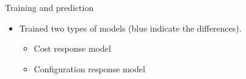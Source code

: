 \documentclass[10pt]{beamer}
\begin{document}
\begin{frame}[t, noframenumbering]{Training and prediction}

\begin{itemize}
\item Trained two types of models (blue indicate the differences).
\begin{itemize}
  \item Cost response model
  \item Configuration response model
\end{itemize}
\end{itemize}


\begin{columns}[T] %
\begin{column}{.5\textwidth}
\end{column}%
\hfill%
{\begin{column}{.5\textwidth}
\begin{figure}[!ht]
\centering

\end{figure}
\end{column}}
\end{columns}
\end{frame}
\end{document}
